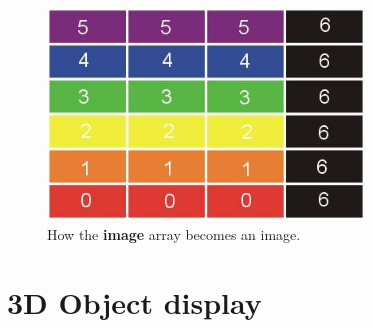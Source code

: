 \begin{figure}[H]
\centering
\includegraphics[width=0.75\textwidth]{pix/image3.jpg}
\caption{How the \textbf{image} array becomes an image.}
\label{fig:6}
\end{figure}
 
\newpage
\section{3D Object display}
\label{sec:2-4}

